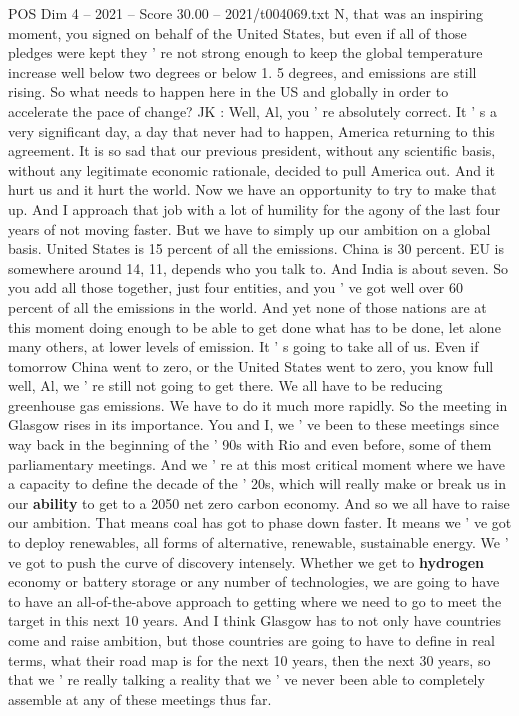 \begin{textsample}{POS Dim 4 – 2021 – Score 30.00 – 2021/t004069.txt}
N, that was an inspiring moment, you signed on behalf of the United States, but even if all of those pledges were kept they ' re not strong enough to keep the global temperature increase well below two degrees or below 1. 5 degrees, and emissions are still rising.
So what needs to happen here in the US and globally in order to accelerate the pace of change?
JK : Well, Al, you ' re absolutely correct.
It ' s a very significant day, a day that never had to happen, America returning to this agreement.
It is so sad that our previous president, without any scientific basis, without any legitimate economic rationale, decided to pull America out.
And it hurt us and it hurt the world.
Now we have an opportunity to try to make that up.
And I approach that job with a lot of humility for the agony of the last four years of not moving faster.
But we have to simply up our ambition on a global basis.
United States is 15 percent of all the emissions.
China is 30 percent.
EU is somewhere around 14, 11, depends who you talk to.
And India is about seven.
So you add all those together, just four entities, and you ' ve got well over 60 percent of all the emissions in the world.
And yet none of those nations are at this moment doing enough to be able to get done what has to be done, let alone many others, at lower levels of emission.
It ' s going to take all of us.
Even if tomorrow China went to zero, or the United States went to zero, you know full well, Al, we ' re still not going to get there.
We all have to be reducing greenhouse gas emissions.
We have to do it much more rapidly.
So the meeting in Glasgow rises in its importance.
You and I, we ' ve been to these meetings since way back in the beginning of the ' 90s with Rio and even before, some of them parliamentary meetings.
And we ' re at this most critical moment where we have a capacity to define the decade of the ' 20s, which will really make or break us in our \textbf{ability} to get to a 2050 net zero carbon economy.
And so we all have to raise our ambition.
That means coal has got to phase down faster.
It means we ' ve got to deploy renewables, all forms of alternative, renewable, sustainable energy.
We ' ve got to push the curve of discovery intensely.
Whether we get to \textbf{hydrogen} economy or battery storage or any number of technologies, we are going to have to have an all-of-the-above approach to getting where we need to go to meet the target in this next 10 years.
And I think Glasgow has to not only have countries come and raise ambition, but those countries are going to have to define in real terms, what their road map is for the next 10 years, then the next 30 years, so that we ' re really talking a reality that we ' ve never been able to completely assemble at any of these meetings thus far.

\end{textsample}
